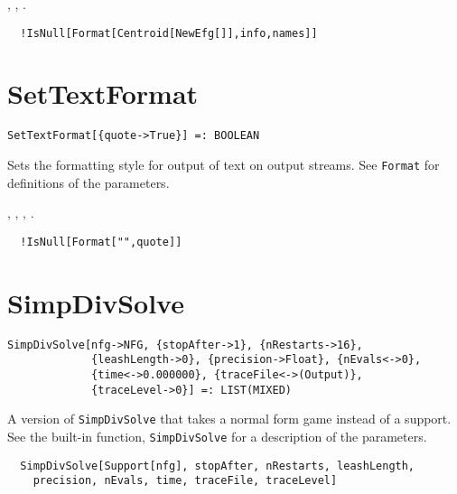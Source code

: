 \seealso
{},
,
.

\udfbody
\begin{verbatim}
  !IsNull[Format[Centroid[NewEfg[]],info,names]]
\end{verbatim} 


\section*{SetTextFormat}\label{ExtSetTextFormat}
\begin{verbatim}
SetTextFormat[{quote->True}] =: BOOLEAN 
\end{verbatim}

\noindent
Sets the formatting style for output of text on output streams.
See \verb+Format+ for definitions of the parameters.

\seealso
{},
,
,
.

\udfbody
\begin{verbatim}
  !IsNull[Format["",quote]]
\end{verbatim} 


\section*{SimpDivSolve}\label{ExtSimpDivSolve}
\begin{verbatim}
SimpDivSolve[nfg->NFG, {stopAfter->1}, {nRestarts->16}, 
             {leashLength->0}, {precision->Float}, {nEvals<->0}, 
             {time<->0.000000}, {traceFile<->(Output)}, 
             {traceLevel->0}] =: LIST(MIXED) 
\end{verbatim}

\noindent
A version of \verb+SimpDivSolve+ that takes a normal form
game instead of a support.  See the built-in function,
\verb+SimpDivSolve+ for a description of the parameters.

\udfbody
\begin{verbatim}
  SimpDivSolve[Support[nfg], stopAfter, nRestarts, leashLength,
    precision, nEvals, time, traceFile, traceLevel]
\end{verbatim} 

